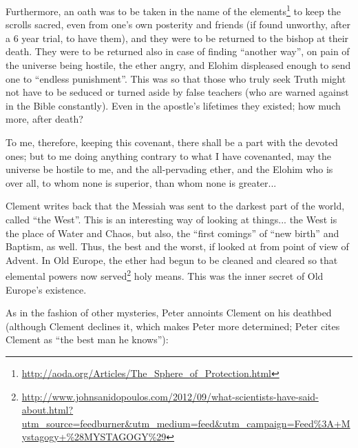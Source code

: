 Furthermore, an oath was to be taken in the name of the elements\footnote{\url{http://aoda.org/Articles/The\_Sphere\_of\_Protection.html}} to keep the scrolls sacred, even from one's own posterity and friends (if found unworthy, after a 6 year trial, to have them), and they were to be returned to the bishop at their death. They were to be returned also in case of finding ``another way'', on pain of the universe being hostile, the ether angry, and Elohim displeased enough to send one to ``endless punishment''. This was so that those who truly seek Truth might not have to be seduced or turned aside by false teachers (who are warned against in the Bible constantly). Even in the apostle's lifetimes they existed; how much more, after death?

\begin{quotex}
To me, therefore, keeping this covenant, there shall be a part with the devoted ones; but to me doing anything contrary to what I have covenanted, may the universe be hostile to me, and the all-pervading ether, and the Elohim who is over all, to whom none is superior, than whom none is greater... 
\end{quotex}

Clement writes back that the Messiah was sent to the darkest part of the world, called ``the West''. This is an interesting way of looking at things... the West is the place of Water and Chaos, but also, the ``first comings'' of ``new birth'' and Baptism, as well. Thus, the best and the worst, if looked at from point of view of Advent. In Old Europe, the ether had begun to be cleaned and cleared so that elemental powers now served\footnote{\url{http://www.johnsanidopoulos.com/2012/09/what-scientists-have-said-about.html?utm\_source=feedburner\&utm\_medium=feed&utm\_campaign=Feed\%3A+Mystagogy+\%28MYSTAGOGY\%29}} holy means. This was the inner secret of Old Europe's existence.

As in the fashion of other mysteries, Peter annoints Clement on his deathbed (although Clement declines it, which makes Peter more determined; Peter cites Clement as ``the best man he knows''):

